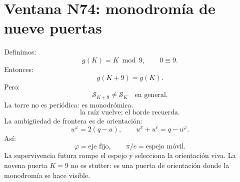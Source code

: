 
\section*{Ventana N74: monodromía de nueve puertas}
Definimos:
\[
g(K)=K\bmod9,\qquad 0\equiv9.
\]
Entonces:
\[
\boxed{g(K+9)=g(K).}
\]
Pero:
\[
\boxed{\mathcal S_{K+9}\neq\mathcal S_K\quad\text{en general}.}
\]
La torre no es periódica: es monodrómica.
\[
\boxed{\text{la raíz vuelve; el borde recuerda.}}
\]
La ambigüedad de frontera es de orientación:
\[
u^\varphi=2(q-a),
\qquad
u^\pi+u^e=q-u^\varphi.
\]
Así:
\[
\boxed{\varphi=\text{eje fijo},\qquad \pi/e=\text{espejo móvil}.}
\]
La supervivencia futura rompe el espejo y selecciona la orientación viva.
La novena puerta \(K=9\) no es stutter: es una puerta de orientación donde la monodromía se hace visible.
